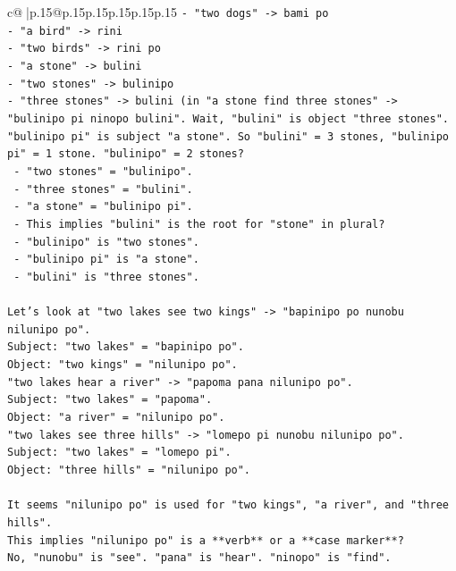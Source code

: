 \documentclass{article}
\begin{document}
{\begin{supertabular}{c@{$\;$}|p{.15\linewidth}@{}p{.15\linewidth}p{.15\linewidth}p{.15\linewidth}p{.15\linewidth}p{.15\linewidth}}
{{{\texttt{{-} "two dogs" {-}> bami po} \\
\texttt{{-} "a bird" {-}> rini} \\
\texttt{{-} "two birds" {-}> rini po} \\
\texttt{{-} "a stone" {-}> bulini} \\
\texttt{{-} "two stones" {-}> bulinipo} \\
\texttt{{-} "three stones" {-}> bulini (in "a stone find three stones" {-}> "bulinipo pi ninopo bulini". Wait, "bulini" is object "three stones". "bulinipo pi" is subject "a stone". So "bulini" = 3 stones, "bulinipo pi" = 1 stone. "bulinipo" = 2 stones?} \\
\texttt{  {-} "two stones" = "bulinipo".} \\
\texttt{  {-} "three stones" = "bulini".} \\
\texttt{  {-} "a stone" = "bulinipo pi".} \\
\texttt{  {-} This implies "bulini" is the root for "stone" in plural?} \\
\texttt{  {-} "bulinipo" is "two stones".} \\
\texttt{  {-} "bulinipo pi" is "a stone".} \\
\texttt{  {-} "bulini" is "three stones".} \\
\\ 
\texttt{Let's look at "two lakes see two kings" {-}> "bapinipo po nunobu nilunipo po".} \\
\texttt{Subject: "two lakes" = "bapinipo po".} \\
\texttt{Object: "two kings" = "nilunipo po".} \\
\texttt{"two lakes hear a river" {-}> "papoma pana nilunipo po".} \\
\texttt{Subject: "two lakes" = "papoma".} \\
\texttt{Object: "a river" = "nilunipo po".} \\
\texttt{"two lakes see three hills" {-}> "lomepo pi nunobu nilunipo po".} \\
\texttt{Subject: "two lakes" = "lomepo pi".} \\
\texttt{Object: "three hills" = "nilunipo po".} \\
\\ 
\texttt{It seems "nilunipo po" is used for "two kings", "a river", and "three hills".} \\
\texttt{This implies "nilunipo po" is a **verb** or a **case marker**?} \\
\texttt{No, "nunobu" is "see". "pana" is "hear". "ninopo" is "find".} \\
}}}
\end{supertabular}}
\end{document}
